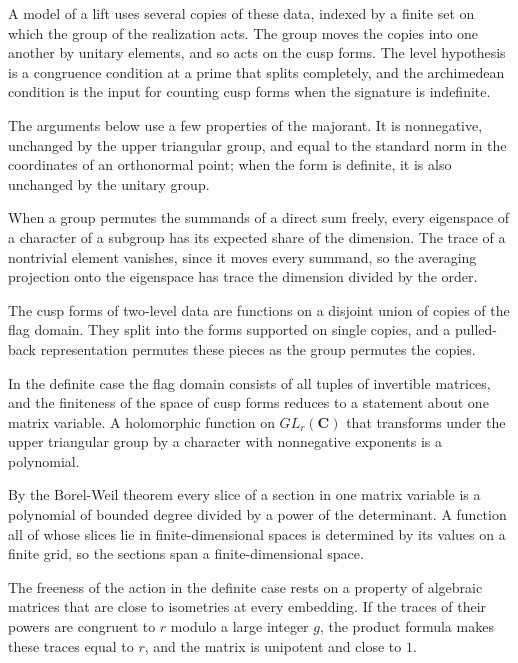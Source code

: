 A model of a lift uses several copies of these data, indexed by a finite set on which the group of
the realization acts. The group moves the copies into one another by unitary elements, and so acts on
the cusp forms. The level hypothesis is a congruence condition at a prime that splits completely, and
the archimedean condition is the input for counting cusp forms when the signature is indefinite.

The arguments below use a few properties of the majorant. It is nonnegative, unchanged by the upper
triangular group, and equal to the standard norm in the coordinates of an orthonormal point; when
the form is definite, it is also unchanged by the unitary group.

When a group permutes the summands of a direct sum freely, every eigenspace of a character of a
subgroup has its expected share of the dimension. The trace of a nontrivial element vanishes, since
it moves every summand, so the averaging projection onto the eigenspace has trace the dimension
divided by the order.

The cusp forms of two-level data are functions on a disjoint union of copies of the flag domain. They
split into the forms supported on single copies, and a pulled-back representation permutes these
pieces as the group permutes the copies.

In the definite case the flag domain consists of all tuples of invertible matrices, and the finiteness
of the space of cusp forms reduces to a statement about one matrix variable. A holomorphic function
on $GL_r(\mathbf C)$ that transforms under the upper triangular group by a character with nonnegative
exponents is a polynomial.

By the Borel-Weil theorem every slice of a section in one matrix variable is a polynomial of bounded
degree divided by a power of the determinant. A function all of whose slices lie in
finite-dimensional spaces is determined by its values on a finite grid, so the sections span a
finite-dimensional space.

The freeness of the action in the definite case rests on a property of algebraic matrices that are
close to isometries at every embedding. If the traces of their powers are congruent to $r$ modulo a
large integer $g$, the product formula makes these traces equal to $r$, and the matrix is unipotent
and close to $1$.

